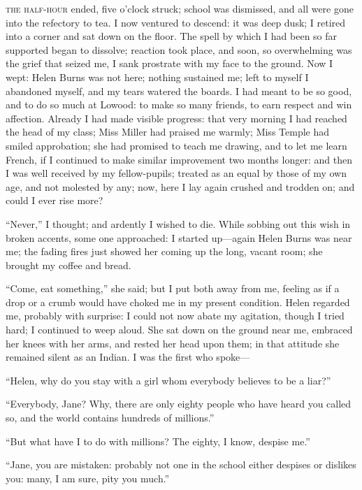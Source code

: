 
 \textsc{the half-hour} ended, five o'clock struck; school was dismissed, and
all were gone into the refectory to tea. I now ventured to descend: it
was deep dusk; I retired into a corner and sat down on the floor. The
spell by which I had been so far supported began to dissolve; reaction
took place, and soon, so overwhelming was the grief that seized me, I
sank prostrate with my face to the ground. Now I wept: Helen Burns was
not here; nothing sustained me; left to myself I abandoned myself, and
my tears watered the boards. I had meant to be so good, and to do so
much at Lowood: to make so many friends, to earn respect and win
affection. Already I had made visible progress: that very morning I had
reached the head of my class; Miss Miller had praised me warmly; Miss
Temple had smiled approbation; she had promised to teach me drawing, and
to let me learn French, if I continued to make similar improvement two
months longer: and then I was well received by my fellow-pupils; treated
as an equal by those of my own age, and not molested by any; now, here I
lay again crushed and trodden on; and could I ever rise more?

\enquote{Never,} I thought; and ardently I wished to die. While sobbing
out this wish in broken accents, some one approached: I started
up---again Helen Burns was near me; the fading fires just showed her
coming up the long, vacant room; she brought my coffee and bread.

\enquote{Come, eat something,} she said; but I put both away from me,
feeling as if a drop or a crumb would have choked me in my present
condition. Helen regarded me, probably with surprise: I could not now
abate my agitation, though I tried hard; I continued to weep aloud. She
sat down on the ground near me, embraced her knees with her arms, and
rested her head upon them; in that attitude she remained silent as an
Indian. I was the first who spoke---

\enquote{Helen, why do you stay with a girl whom everybody believes to
	be a liar?}

\enquote{Everybody, Jane? Why, there are only eighty people who have
	heard you called so, and the world contains hundreds of millions.}

\enquote{But what have I to do with millions? The eighty, I know,
	despise me.}

\enquote{Jane, you are mistaken: probably not one in the school either
	despises or dislikes you: many, I am sure, pity you much.}

